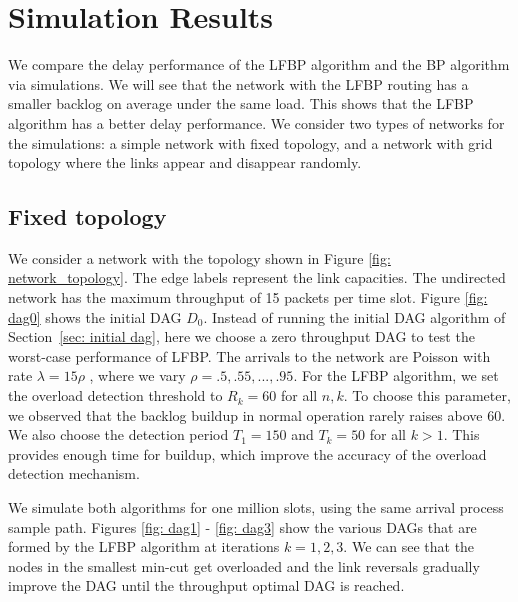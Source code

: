 \documentclass{sig-alternate-2013}
\begin{document}
\section{Simulation Results} \label{simulations}
We compare the delay performance of the LFBP algorithm and the BP algorithm via simulations. 
We will see that the network with the LFBP routing has a smaller backlog on average under the same load. This shows that the LFBP algorithm has a better delay performance. 
We consider two types of networks for the simulations: a simple network with fixed topology, and a network with grid topology where the links appear and disappear randomly. 


\subsection{Fixed topology}
We consider a network with the topology shown in Figure \ref{fig: network_topology}. The edge labels  represent the link capacities. The undirected network has the maximum throughput of 15 packets per time slot. Figure \ref{fig: dag0} shows the initial DAG $D_0$. Instead of running the initial DAG algorithm of Section~\ref{sec: initial dag}, here we choose a zero throughput DAG to test the worst-case performance of LFBP. The arrivals to the network are Poisson with rate $\lambda = 15\rho$ , where we vary $\rho = .5, .55, ..., .95$. For the LFBP algorithm, we set the overload detection threshold to $R_k=60$ for all $n,k$. To choose this parameter, we observed that the backlog buildup in normal operation rarely raises above 60. We also choose the detection period $T_1 = 150$ and $T_k = 50$ for all $k>1$. This provides enough time for buildup, which improve the accuracy of the overload detection mechanism.

We simulate both algorithms for one million slots, using the same arrival process sample path. Figures \ref{fig: dag1} - \ref{fig: dag3} show the various DAGs that are formed by the LFBP algorithm at iterations $k=1,2,3$. We can see that the nodes in the smallest min-cut get overloaded and the link reversals gradually improve the DAG until the throughput optimal DAG is reached.
\end{document}

